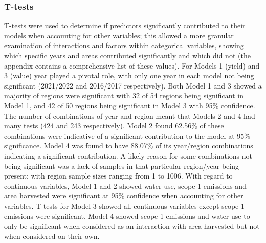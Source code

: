 \documentclass[review,12pt,authoryear]{elsarticle}
\begin{document}
\begin{linenumbers}
\subsubsection{T-tests}
T-tests were used to determine if predictors significantly contributed to their models when accounting for other variables; this allowed a more granular examination of interactions and factors within categorical variables, showing which specific years and areas contributed significantly and which did not (the appendix contains a comprehensive list of these values). 
\newline
For Models 1 (yield) and 3 (value) year played a pivotal role, with only one year in each model not being significant (2021/2022 and 2016/2017 respectively). Both Model 1 and 3 showed a majority of regions were significant with 32 of 54 regions being significant in Model 1, and 42 of 50 regions being significant in Model 3 with 95\% confidence.
\newline
The number of combinations of year and region meant that Models 2 and 4 had many tests (424 and 243 respectively). Model 2 found 62.56\% of these combinations were indicative of a significant contribution to the model at 95\% significance. Model 4 was found to have 88.07\% of its year/region combinations indicating a significant contribution. A likely reason for some combinations not being significant was a lack of samples in that particular region/year being present; with region sample sizes ranging from 1 to 1006.
\newline
With regard to continuous variables, Model 1 and 2 showed water use, scope 1 emissions and area harvested were significant at 95\% confidence when accounting for other variables. T-tests for Model 3 showed all continuous variables except scope 1 emissions were significant. Model 4 showed scope 1 emissions and water use to only be significant when considered as an interaction with area harvested but not when considered on their own.

\end{linenumbers}
\end{document}

